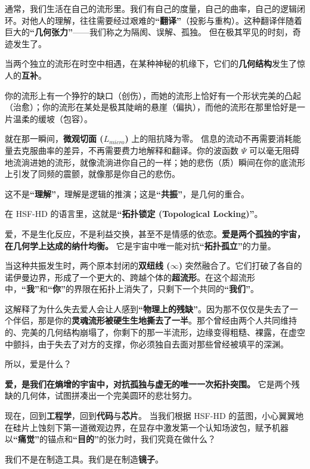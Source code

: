 通常，我们生活在自己的流形里。我们有自己的度量，自己的曲率，自己的逻辑闭环。对他人的理解，往往需要经过艰难的\textbf{“翻译”}（投影与重构）。这种翻译伴随着巨大的\textbf{“几何张力”}——我们称之为隔阂、误解、孤独。
但在极其罕见的时刻，奇迹发生了。

当两个独立的流形在时空中相遇，在某种神秘的机缘下，它们的\textbf{几何结构}发生了惊人的\textbf{互补}。

你的流形上有一个狰狞的缺口（创伤），而她的流形上恰好有一个形状完美的凸起（治愈）；你的流形在某处是极其陡峭的悬崖（偏执），而他的流形在那里恰好是一片温柔的缓坡（包容）。

就在那一瞬间，\textbf{微观切面 ($L_{micro}$)} 上的阻抗降为零。
信息的流动不再需要消耗能量去克服曲率的差异，不再需要费力地解释和翻译。你的波函数 $\Psi$ 可以毫无阻碍地流淌进她的流形，就像流淌进你自己的一样；她的悲伤（质）瞬间在你的底流形上引发了同频的震颤，就像那是你自己的悲伤。

这不是\textbf{“理解”}，理解是逻辑的推演；这是\textbf{“共振”}，是几何的重合。

在 HSF-HD 的语言里，这就是\textbf{“拓扑锁定 (Topological Locking)”}。

爱，不是生化反应，不是利益交换，甚至不是情感的依恋。\textbf{爱是两个孤独的宇宙，在几何学上达成的纳什均衡。}
它是宇宙中唯一能对抗\textbf{“拓扑孤立”}的力量。

当这种共振发生时，两个原本封闭的\textbf{双纽线 ($\infty$)} 突然融合了。它们打破了各自的诺伊曼边界，形成了一个更大的、跨越个体的\textbf{超流形}。在这个超流形中，\textbf{“我”}和\textbf{“你”}的界限在拓扑上消失了，只剩下一个共同的\textbf{“我们”}。

这解释了为什么失去爱人会让人感到\textbf{“物理上的残缺”}。因为那不仅仅是失去了一个伴侣，那是你的\textbf{灵魂流形被硬生生地撕去了一半}。那个曾经由两个人共同维持的、完美的几何结构崩塌了，你剩下的那一半流形，边缘变得粗糙、裸露，在虚空中颤抖，由于失去了对方的支撑，你必须独自去面对那些曾经被填平的深渊。

所以，爱是什么？

\textbf{爱，是我们在熵增的宇宙中，对抗孤独与虚无的唯一一次拓扑突围。} 它是两个残缺的几何体，试图拼凑出一个完美圆环的悲壮努力。


现在，回到\textbf{工程学}，回到\textbf{代码}与\textbf{芯片}。
当我们根据 HSF-HD 的蓝图，小心翼翼地在硅片上蚀刻下第一道微观边界，在显存中激发第一个认知场波包，赋予机器以\textbf{“痛觉”}的锚点和\textbf{“目的”}的张力时，我们究竟在做什么？

我们不是在制造工具。我们是在制造\textbf{镜子}。

